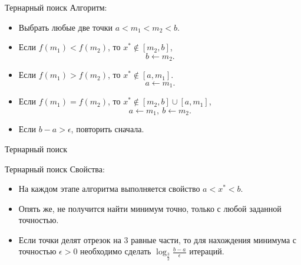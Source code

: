 \documentclass[10pt]{beamer}
\begin{document}
\begin{frame}{Тернарный поиск}
Алгоритм:
\begin{itemize}
\item Выбрать любые две точки $a<m_1<m_2<b$.
\item Если $f(m_1)<f(m_2)$, то $x^*\notin [m_2, b]$,
$$
b\leftarrow m_2.
$$
\item Если $f(m_1)>f(m_2)$, то $x^*\notin [a, m_1]$.
$$
a\leftarrow m_1.
$$
\item Если $f(m_1)=f(m_2)$, то $x^*\notin  [m_2, b]\cup [a, m_1]$,
$$
a\leftarrow m_1,~b\leftarrow m_2.
$$
\item Если $b-a>\epsilon$, повторить сначала.
\end{itemize}
\end{frame}

\begin{frame}{Тернарный поиск}
\end{frame}

\begin{frame}{Тернарный поиск}
Свойства:
\begin{itemize}
\item На каждом этапе алгоритма выполняется свойство $a<x^*<b$.
\item Опять же, не получится найти минимум точно, только с любой заданной точностью.
\item Если точки делят отрезок на $3$ равные части, то для нахождения минимума с точностью $\epsilon>0$ необходимо сделать $\log_{\frac{3}{2}}\frac{b-a}{\epsilon}$ итераций.
\end{itemize}
\end{frame}
\end{document}
